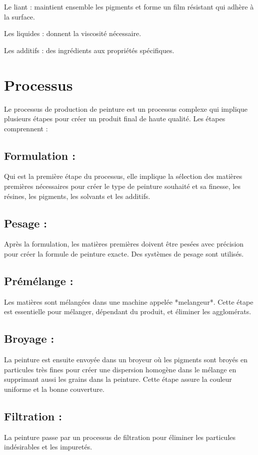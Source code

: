 \documentclass[20pt,a4paper]{report}
\begin{document}
\begin{large}
Le liant : maintient ensemble les pigments et forme un film résistant qui adhère à la surface.

Les liquides : donnent la viscosité nécessaire.

Les additifs : des ingrédients aux propriétés spécifiques.

		\section{Processus }
Le processus de production de peinture est un processus complexe qui implique plusieurs étapes pour créer un produit final de haute qualité. Les étapes comprennent :
			\subsection{Formulation : }
Qui est la première étape du processus, elle implique la sélection des matières premières nécessaires pour créer le type de peinture souhaité et sa finesse, les résines, les pigments, les solvants et les additifs.

			\subsection{Pesage : }
Après la formulation, les matières premières doivent être pesées avec précision pour créer la formule de peinture exacte. Des systèmes de pesage sont utilisés.

			\subsection{Prémélange : }
Les matières sont mélangées dans une machine appelée *melangeur*. Cette étape est essentielle pour mélanger, dépendant du produit, et éliminer les agglomérats.

			\subsection{Broyage : }
La peinture est ensuite envoyée dans un broyeur où les pigments sont broyés en particules très fines pour créer une dispersion homogène dans le mélange en supprimant aussi les grains dans la peinture. Cette étape assure la couleur uniforme et la bonne couverture.

			\subsection{Filtration : }
La peinture passe par un processus de filtration pour éliminer les particules indésirables et les impuretés.


\end{large}
\end{document}
